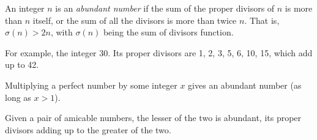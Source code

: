 \documentclass[12pt]{article}
\begin{document}
An integer $n$ is an {\em abundant number} if the sum of the proper divisors of $n$ is more than $n$ itself, or the sum of all the divisors is more than twice $n$. That is, $\sigma(n) > 2n$, with $\sigma(n)$ being the sum of divisors function.

For example, the integer 30. Its proper divisors are 1, 2, 3, 5, 6, 10, 15, which add up to 42.

Multiplying a perfect number by some integer $x$ gives an abundant number (as long as $x > 1$).

Given a pair of amicable numbers, the lesser of the two is abundant, its proper divisors adding up to the greater of the two.
\end{document}
